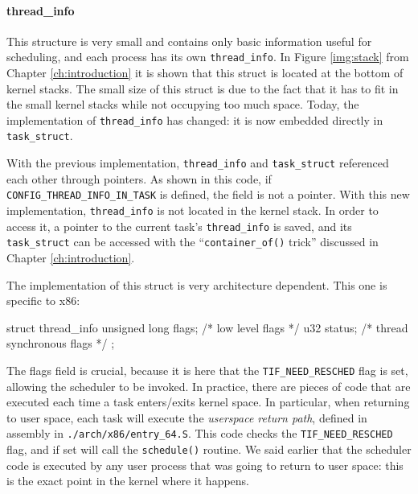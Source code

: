 \paragraph{thread\_info}
\label{sec:thread_info}
This structure is very small and contains only basic information useful for scheduling, and each process has its own \verb|thread_info|. In Figure \ref{img:stack} from Chapter \ref{ch:introduction} it is shown that this struct is located at the bottom of kernel stacks. The small size of this struct is due to the fact that it has to fit in the small kernel stacks while not occupying too much space. Today, the implementation of \verb|thread_info| has changed: it is now embedded directly in \verb|task_struct|. 

\begin{code}
struct task_struct {
#ifdef CONFIG_THREAD_INFO_IN_TASK
	/*
	 * For reasons of header soup (see current_thread_info()), this
	 * must be the first element of task_struct.
	 */
	struct thread_info  thread_info;
#endif
// ...
\end{code}
With the previous implementation, \verb|thread_info| and \verb|task_struct| referenced each other through pointers. As shown in this code, if \verb|CONFIG_THREAD_INFO_IN_TASK| is defined, the field is not a pointer. With this new implementation, \verb|thread_info| is not located in the kernel stack. In order to access it, a pointer to the current task's \verb|thread_info| is saved, and its \verb|task_struct| can be accessed with the ``\verb|container_of()| trick'' discussed in Chapter \ref{ch:introduction}. 

The implementation of this struct is very architecture dependent. This one is specific to x86:
\begin{code}
struct thread_info {
	unsigned long   flags;  /* low level flags */
	u32 status;             /* thread synchronous flags */
};
\end{code}
The flags field is crucial, because it is here that the \verb|TIF_NEED_RESCHED| flag is set, allowing the scheduler to be invoked. In practice, there are pieces of code that are executed each time a task enters/exits kernel space. In particular, when returning to user space, each task will execute the \textit{userspace return path}, defined in assembly in \verb|./arch/x86/entry_64.S|. This code checks the \verb|TIF_NEED_RESCHED| flag, and if set will call the \verb|schedule()| routine. We said earlier that the scheduler code is executed by any user process that was going to return to user space: this is the exact point in the kernel where it happens.

